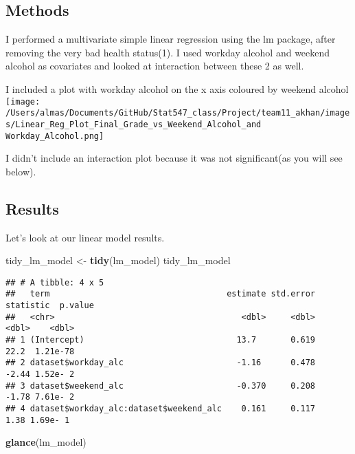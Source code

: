 \documentclass[]{article}
\newenvironment{Shaded}{\begin{snugshade}}{\end{snugshade}}
\newcommand{\KeywordTok}[1]{\textcolor[rgb]{0.13,0.29,0.53}{\textbf{#1}}}
\newcommand{\NormalTok}[1]{#1}
\newcommand{\StringTok}[1]{\textcolor[rgb]{0.31,0.60,0.02}{#1}}
\begin{document}
\hypertarget{methods}{%
\subsection{Methods}\label{methods}}

I performed a multivariate simple linear regression using the lm
package, after removing the very bad health status(1). I used workday
alcohol and weekend alcohol as covariates and looked at interaction
between these 2 as well.

I included a plot with workday alcohol on the x axis coloured by weekend
alcohol
\texttt{[image: /Users/almas/Documents/GitHub/Stat547\_class/Project/team11\_akhan/images/Linear\_Reg\_Plot\_Final\_Grade\_vs\_Weekend\_Alcohol\_and Workday\_Alcohol.png]}

I didn't include an interaction plot because it was not significant(as
you will see below).

\hypertarget{results}{%
\subsection{Results}\label{results}}

Let's look at our linear model results.

\begin{Shaded}
\begin{Highlighting}[]
\NormalTok{tidy_lm_model <-}\StringTok{ }\KeywordTok{tidy}\NormalTok{(lm_model)}
\NormalTok{tidy_lm_model}
\end{Highlighting}
\end{Shaded}

\begin{verbatim}
## # A tibble: 4 x 5
##   term                                    estimate std.error statistic  p.value
##   <chr>                                      <dbl>     <dbl>     <dbl>    <dbl>
## 1 (Intercept)                               13.7       0.619     22.2  1.21e-78
## 2 dataset$workday_alc                       -1.16      0.478     -2.44 1.52e- 2
## 3 dataset$weekend_alc                       -0.370     0.208     -1.78 7.61e- 2
## 4 dataset$workday_alc:dataset$weekend_alc    0.161     0.117      1.38 1.69e- 1
\end{verbatim}

\begin{Shaded}
\begin{Highlighting}[]
\KeywordTok{glance}\NormalTok{(lm_model)}
\end{Highlighting}
\end{Shaded}
\end{document}
